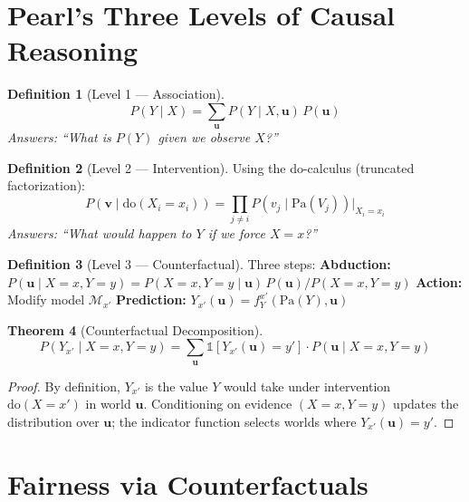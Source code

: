 \documentclass[12pt,a4paper]{report}
\theoremstyle{plain}
\newtheorem{theorem}{Theorem}[chapter]
\theoremstyle{definition}
\newtheorem{definition}[theorem]{Definition}
\theoremstyle{remark}
\newcommand{\scmmodel}{\mathcal{M}}
\newcommand{\ind}{\mathbb{1}}
\newcommand{\Pa}{\text{Pa}}
\newcommand{\doop}{\text{do}}
\begin{document}
\section{Pearl's Three Levels of Causal Reasoning}

\begin{definition}[Level 1 --- Association]
\label{def:level1}
\begin{equation}
    P(Y \mid X)
    = \sum_{\mathbf{u}} P(Y \mid X, \mathbf{u})\, P(\mathbf{u})
\end{equation}
\emph{Answers: ``What is $P(Y)$ given we observe $X$?''}
\end{definition}

\begin{definition}[Level 2 --- Intervention]
\label{def:level2}
Using the do-calculus (truncated factorization):
\begin{equation}
    P(\mathbf{v} \mid \doop(X_i = x_i))
    = \prod_{j \neq i} P(v_j \mid \Pa(V_j))
      \bigg|_{X_i = x_i}
\end{equation}
\emph{Answers: ``What would happen to $Y$ if we force $X = x$?''}
\end{definition}

\begin{definition}[Level 3 --- Counterfactual]
\label{def:level3}
Three steps:
\textbf{Abduction:}
$P(\mathbf{u} \mid X{=}x, Y{=}y)
= P(X{=}x, Y{=}y \mid \mathbf{u})\,P(\mathbf{u})
  / P(X{=}x, Y{=}y)$\quad
\textbf{Action:} Modify model $\scmmodel_{x'}$\quad
\textbf{Prediction:} $Y_{x'}(\mathbf{u})
= f_Y^{x'}(\Pa(Y), \mathbf{u})$
\end{definition}

\begin{theorem}[Counterfactual Decomposition]
\label{thm:cf-decomp}
\begin{equation}
    P(Y_{x'} \mid X = x, Y = y)
    = \sum_{\mathbf{u}}
      \ind\!\left[Y_{x'}(\mathbf{u}) = y'\right]
      \cdot P(\mathbf{u} \mid X = x, Y = y)
\end{equation}
\end{theorem}
\begin{proof}
By definition, $Y_{x'}$ is the value $Y$ would take under
intervention $\doop(X=x')$ in world $\mathbf{u}$.
Conditioning on evidence $(X=x, Y=y)$ updates
the distribution over $\mathbf{u}$; the indicator
function selects worlds where $Y_{x'}(\mathbf{u}) = y'$.
\end{proof}

\section{Fairness via Counterfactuals}
\end{document}
